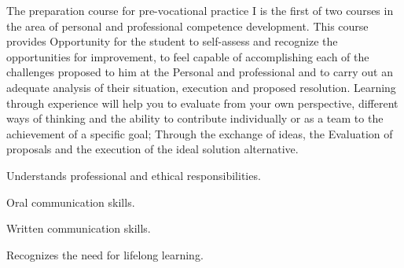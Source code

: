 \begin{syllabus}


\begin{justification}
The preparation course for pre-vocational practice I is the first of two courses in the area of personal and professional competence development. This course provides
Opportunity for the student to self-assess and recognize the opportunities for improvement, to feel capable of accomplishing each of the challenges proposed to him at the
Personal and professional and to carry out an adequate analysis of their situation, execution and proposed resolution.
Learning through experience will help you to evaluate from your own perspective, different ways of thinking and the ability to contribute individually or as a team to the achievement of a specific goal; Through the exchange of ideas, the
Evaluation of proposals and the execution of the ideal solution alternative.

\end{justification}

\begin{goals}
    \item Understands professional and ethical responsibilities.
    \item Oral communication skills.
    \item Written communication skills.
    \item Recognizes the need for lifelong learning.
\end{goals}

\begin{outcomes}
    \item {} %
    \item {} %
    \item {} %
    \item {} %
\end{outcomes}

\begin{competences}
    \item {}
    \item {}
    \item {}
    \item {}
\end{competences}


\end{syllabus}
